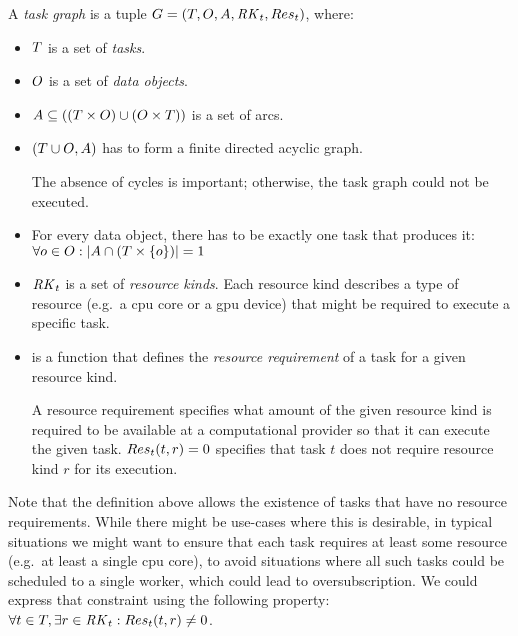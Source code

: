 \vspace{2mm} A \emph{task graph} is a tuple
$G = (T, O, A, \mathit{RK}_t, Res_t)$, where:
\begin{itemize}[itemsep=0pt]
	\item $T$ is a set of \emph{tasks}.
	\item $O$ is a set of \emph{data objects}.
	\item $A \subseteq ((T\times{}O) \cup (O\times{}T))$
	is a set of arcs.
	\item $(T \cup O, A)$ has to form a finite directed acyclic graph.

	The absence of cycles is important; otherwise, the task graph could not be executed.
	\item For every data object, there has to be exactly one task that produces it: \vspace{1mm}\\
	$\forall o \in O: |A \cap (T \times \{o\})| = 1$
	\item $\mathit{RK}_t$ is a set of \emph{resource kinds}. Each resource kind
	      describes a type of resource (e.g.\ a \gls{cpu} core or a \gls{gpu} device)
	      that might be required to execute a specific task.
	\item {} is a function that defines the
	      \emph{resource requirement} of a task for a given resource kind.

	      A resource requirement specifies what amount of the given resource kind is required to
		  be available at a computational provider so that it can execute the given task.
		  $Res_t(t, r) = 0$ specifies that task $t$ does not require resource kind $r$ for its
		  execution.
\end{itemize}

\vspace{2mm}Note that the definition above allows the existence of tasks that have no resource
requirements. While there might be use-cases where this is desirable, in typical situations we might
want to ensure that each task requires at least some resource (e.g.\ at least a single \gls{cpu} core),
to avoid situations where all such tasks could be scheduled to a single worker, which could lead to
oversubscription. We could express that constraint using the following property: $\forall t\in T, \exists r\in\mathit{RK}_t: Res_t(t, r) \neq 0$.

